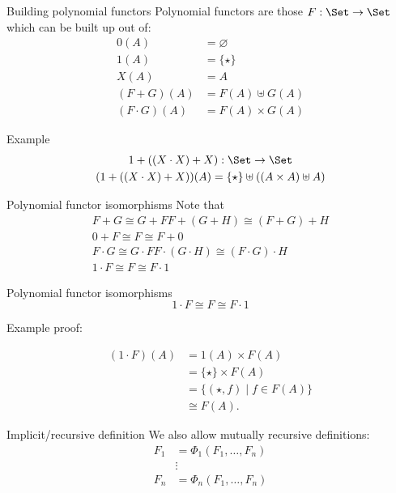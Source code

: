 \documentclass[xcolor=svgnames,12pt]{beamer}
\newenvironment{xframe}[1][]
  {\begin{frame}[fragile,environment=xframe,#1]}
  {\end{frame}}
\begin{document}
\begin{xframe}{Building polynomial functors}
  Polynomial functors are those $F : \Set \to \Set$ which can be built
  up out of:
  \begin{align*}
    0(A) &= \varnothing \\
    1(A) &= \{\star\} \\
    X(A) &= A \\
    (F + G)(A) &= F(A) \uplus G(A) \\
    (F \cdot G)(A) &= F(A) \times G(A)
  \end{align*}
\end{xframe}

\begin{xframe}{Example}
  \begin{gather*}
    1 + ((X \cdot X) + X) : \Set \to \Set \\
    (1 + ((X \cdot X) + X))(A) = \{\star\} \uplus ((A \times A) \uplus A)
  \end{gather*}
\end{xframe}

\begin{xframe}{Polynomial functor isomorphisms}
  Note that
  \begin{gather*}
    F + G \cong G + F
    F + (G + H) \cong (F + G) + H \\
    0 + F \cong F \cong F + 0 \\
    F \cdot G \cong G \cdot F
    F \cdot (G \cdot H) \cong (F \cdot G) \cdot H \\
    1 \cdot F \cong F \cong F \cdot 1
  \end{gather*}
\end{xframe}

\begin{xframe}{Polynomial functor isomorphisms}
\[ 1 \cdot F \cong F \cong F \cdot 1 \]

Example proof:

  \begin{align*}
    (1 \cdot F)(A) &= 1(A) \times F(A) \\
    &= \{\star\} \times F(A) \\
    &= \{(\star, f) \mid f \in F(A)\} \\
    &\cong F(A).
  \end{align*}
\end{xframe}

\begin{xframe}{Implicit/recursive definition}
  We also allow mutually recursive definitions:
  \begin{align*}
    F_1 &= \Phi_1(F_1, \dots, F_n) \\
    &\vdots \\
    F_n &= \Phi_n(F_1, \dots, F_n)
  \end{align*}
\end{xframe}
\end{document}
